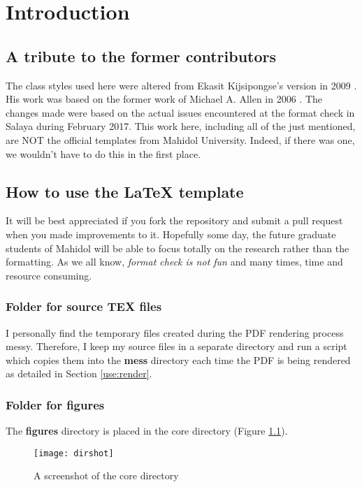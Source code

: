 \chapter{Introduction} \label{chap:intro}

\section{A tribute to the former contributors}
The class styles used here were altered from Ekasit Kijsipongse's version in 2009 \cite{EkasitMuThesis}.
His work was based on the former work of Michael A. Allen in 2006 \cite{allenMuThesis}.
The changes made were based on the actual issues encountered at the format check in Salaya during February 2017.
This work here, including all of the just mentioned, are NOT the official templates from Mahidol University. Indeed, if there was one, we wouldn't have to do this in the first place.


\section{How to use the LaTeX template} \label{sec:use}
It will be best appreciated if you fork the repository and submit a pull request when you made improvements to it.
Hopefully some day, the future graduate students of Mahidol will be able to focus totally on the research rather than the formatting. As we all know, \textit{format check is not fun} and many times, time and resource consuming.


\subsection{Folder for source TEX files} \label{use:source}
I personally find the temporary files created during the PDF rendering process messy. Therefore, I keep my source files in a separate directory and run a script which copies them into the \textbf{mess} directory each time the PDF is being rendered as detailed in Section \ref{use:render}.

\subsection{Folder for figures} \label{use:fig}
The \textbf{figures} directory is placed in the core directory (Figure \ref{fig:screenshot}).

\begin{figure}[!htpb]
    \centering
    \texttt{[image: dirshot]} %
    \caption{A screenshot of the core directory \cite{hatioMuThesis}} %
    \label{fig:screenshot}
\end{figure}


